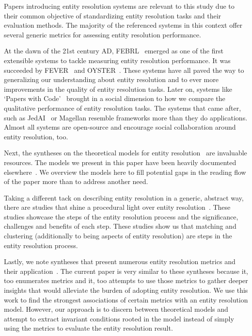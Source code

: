 \documentclass[journal]{IEEEtran}
\begin{document}
    Papers introducing entity resolution systems are relevant to this study due
    to their common objective of standardizing entity resolution tasks and their
    evaluation methods.
    The majority of the referenced systems in this context offer several generic
    metrics for assessing entity resolution performance.

    At the dawn of the 21st century AD, FEBRL~\cite{febrl2002} emerged as one of
    the first extensible systems to tackle measuring entity resolution
    performance.
    It was succeeded by FEVER~\cite{fever2009} and OYSTER~\cite{oyster2012}.
    These systems have all paved the way to generalizing our understanding about
    entity resolution and to ever more improvements in the quality of entity
    resolution tasks.
    Later on, systems like `Papers with Code'~\cite{papwithcode2019} brought in
    a social dimension to how we compare the qualitative performance of entity
    resolution tasks.
    The systems that came after, such as JedAI~\cite{jedai2017} or Magellan
    \cite{magellan2020} resemble frameworks more than they do
    applications.
    Almost all systems are open-source and encourage social collaboration around
    entity resolution, too.
    
    Next, the syntheses on the theoretical models for entity
    resolution~\cite{fs1969,Ben2009Swoosh,Tal11} are invaluable resources.
    The models we present in this paper have been heavily documented
    elsewhere~\cite{Tal11,tal2013}.    
    We overview the models here to fill potential gaps in the reading flow of
    the paper more than to address another need.
    
    Taking a different tack on describing entity resolution in a generic,
    abstract way, there are studies that shine a procedural light over entity
    resolution~\cite{Pap19,Chen09}.
    These studies showcase the steps of the entity resolution process and the
    significance, challenges and benefits of each step.
    These studies show us that matching and clustering (additionally to being
    aspects of entity resolution) are steps in the entity resolution process.

    Lastly, we note syntheses that present numerous entity resolution metrics
    and their application~\cite{hitesh2012,graf2021frost,barnes2015practioner}.
    The current paper is very similar to these syntheses because it, too
    enumerates metrics and it, too attempts to use those metrics to gather
    deeper insights that would alleviate the burden of adopting entity
    resolution.
    We use this work to find the strongest associations of certain metrics with
    an entity resolution model.
    However, our approach is to discern between theoretical models and attempt
    to extract invariant conditions rooted in the model instead of simply using
    the metrics to evaluate the entity resolution result.
\end{document}
